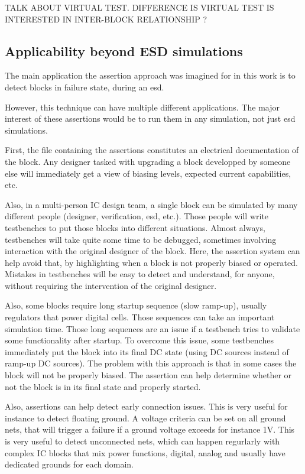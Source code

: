 TALK ABOUT VIRTUAL TEST. DIFFERENCE IS VIRTUAL TEST IS INTERESTED IN INTER-BLOCK RELATIONSHIP ?

\subsection{Applicability beyond ESD simulations}

The main application the assertion approach was imagined for in this work is to detect blocks in failure state,
during an \gls{esd}.

However, this technique can have multiple different applications.
The major interest of these assertions would be to run them in any simulation, not just \gls{esd} simulations.

First, the file containing the assertions constitutes an electrical documentation of the block.
Any designer tasked with upgrading a block developped by someone else will immediately get a view of biasing levels,
expected current capabilities, etc.

Also, in a multi-person IC design team, a single block can be simulated by many different people (designer, verification, esd, etc.).
Those people will write testbenches to put those blocks into different situations.
Almost always, testbenches will take quite some time to be debugged, sometimes involving interaction with the original designer of the block.
Here, the assertion system can help avoid that, by highlighting when a block is not properly biased or operated.
Mistakes in testbenches will be easy to detect and understand, for anyone, without requiring the intervention of the original designer.

Also, some blocks require long startup sequence (slow ramp-up), usually regulators that power digital cells.
Those sequences can take an important simulation time.
Those long sequences are an issue if a testbench tries to validate some functionality after startup.
To overcome this issue, some testbenches immediately put the block into its final DC state (using DC sources instead of ramp-up DC sources).
The problem with this approach is that in some cases the block will not be properly biased.
The assertion can help determine whether or not the block is in its final state and properly started.

Also, assertions can help detect early connection issues.
This is very useful for instance to detect floating ground.
A voltage criteria can be set on all ground nets, that will trigger a failure if a ground voltage exceeds for instance 1V.
This is very useful to detect unconnected nets, which can happen regurlarly with complex IC blocks that mix power functions, digital, analog
and usually have dedicated grounds for each domain.

